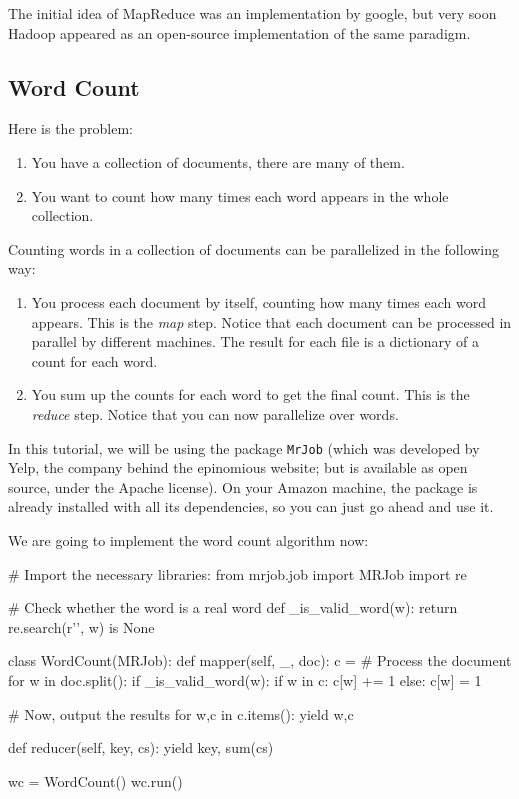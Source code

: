The initial idea of MapReduce was an implementation by google, but very soon
Hadoop appeared as an open-source implementation of the same paradigm.

\subsection{Word Count}

Here is the problem:

\begin{enumerate}
\item You have a collection of documents, there are many of them.
\item You want to count how many times each word appears in the whole collection.
\end{enumerate}

Counting words in a collection of documents can be parallelized in the following way:

\begin{enumerate}
\item You process each document by itself, counting how many times each word
appears. This is the \emph{map} step. Notice that each document can be
processed in parallel by different machines. The result for each file is a
dictionary of a count for each word.
\item You sum up the counts for each word to get the final count. This is the
\emph{reduce} step. Notice that you can now parallelize over words.
\end{enumerate}

In this tutorial, we will be using the package \texttt{MrJob} (which was
developed by Yelp, the company behind the epinomious website; but is available
as open source, under the Apache license). On your Amazon machine, the package
is already installed with all its dependencies, so you can just go ahead and
use it.

We are going to implement the word count algorithm now:

\begin{python}
# Import the necessary libraries:
from mrjob.job import MRJob
import re

# Check whether the word is a real word
def _is_valid_word(w):
    return re.search(r'\W', w) is None

class WordCount(MRJob):
    def mapper(self, _, doc):
        c = {}
        # Process the document
        for w in doc.split():
            if _is_valid_word(w):
                if w in c:
                    c[w] += 1
                else:
                    c[w] = 1

        # Now, output the results
        for w,c in c.items():
            yield w,c

    def reducer(self, key, cs):
        yield key, sum(cs)

wc = WordCount()
wc.run()
\end{python}

